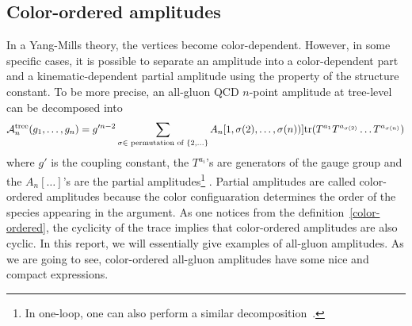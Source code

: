 \subsection*{Color-ordered amplitudes}
In a Yang-Mills theory, the vertices become color-dependent. 
However, in some specific cases, it is possible to separate an amplitude into 
a color-dependent part and a kinematic-dependent partial amplitude using the property of the structure constant.
To be more precise, an all-gluon QCD $n$-point amplitude at tree-level can be decomposed into~\cite{MANGANO1988461}
\begin{equation}\label{color-ordered}
\mathcal{A}_n^{\mathrm{tree}}(g_1, \ldots, g_n) = g'^{n-2}\sum_{\sigma\in\textrm{ permutation of }\{2,\ldots\}} A_n[1,\sigma(2),\ldots,\sigma(n))]\mathrm{tr}(T^{a_1} T^{a_{\sigma(2)}}\ldots T^{a_{\sigma(n)}})
\end{equation}
where $g'$ is the coupling constant, the $T^{a_i}$'s are generators of the gauge group and the $A_n[\ldots]$'s are the partial amplitudes\footnote{
In one-loop, one can also perform a similar decomposition~\cite{BERN1991389}.
}
.
Partial amplitudes are called color-ordered amplitudes because the color configuaration determines the order of the species appearing in the argument.
As one notices from the definition~\cref{color-ordered}, the cyclicity of the trace implies that color-ordered amplitudes are also cyclic. 
In this report, we will essentially give examples of all-gluon amplitudes.
As we are going to see, color-ordered all-gluon amplitudes have some nice and compact expressions.
%
%

